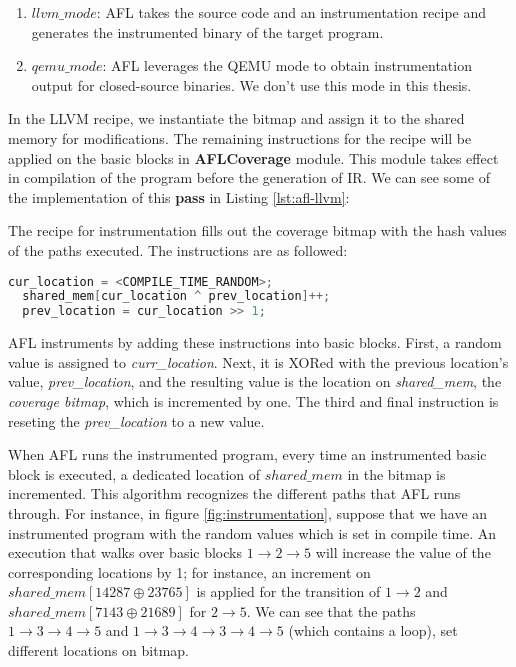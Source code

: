 \begin{enumerate}
  \item \textit{$llvm\_mode$}: AFL takes the source code and an instrumentation recipe and generates the instrumented binary of the target program.
  \item \textit{$qemu\_mode$}: AFL leverages the QEMU mode to obtain instrumentation output for closed-source binaries. We don't use this mode in this thesis.
\end{enumerate}

In the LLVM recipe, we instantiate the bitmap and assign it to the shared memory for modifications. The remaining instructions for the recipe will be applied on the basic blocks in \textbf{AFLCoverage} module. This module takes effect in compilation of the program before the generation of IR. We can see some of the implementation of this \textbf{pass} in Listing \ref{lst:afl-llvm}:



The recipe for instrumentation fills out the coverage bitmap with the hash values of the paths executed. The instructions are as followed:

\begin{lstlisting}[language=C++,style=CodeStyle,label={lst:hash},caption={Select element and update in shared\_mem}]
  cur_location = <COMPILE_TIME_RANDOM>;
  shared_mem[cur_location ^ prev_location]++; 
  prev_location = cur_location >> 1;
\end{lstlisting}

AFL instruments by adding these instructions into basic blocks. First, a random value is assigned to \textit{curr\_location}. Next, it is XORed with the previous location's value, \textit{prev\_location}, and the resulting value is the location on \textit{shared\_mem}, the \textit{coverage bitmap}, which is incremented by one. The third and final instruction is reseting the \textit{prev\_location} to a new value.

\vspace{\baselineskip}

When AFL runs the instrumented program, every time an instrumented basic block is executed, a dedicated location of $shared\_mem$ in the bitmap is incremented. This algorithm recognizes the different paths that AFL runs through. For instance, in figure \ref{fig:instrumentation}, suppose that we have an instrumented program with the random values which is set in compile time. An execution that walks over basic blocks $1\rightarrow2\rightarrow5$ will increase the value of the corresponding locations by 1; for instance, an increment on $shared\_mem[14287 \oplus 23765]$ is applied for the transition of $1\rightarrow2$ and $shared\_mem[7143 \oplus 21689]$ for $2\rightarrow5$. We can see that the paths $1\rightarrow3\rightarrow4\rightarrow5$ and $1\rightarrow3\rightarrow4\rightarrow3\rightarrow4\rightarrow5$ (which contains a loop), set different locations on bitmap.


